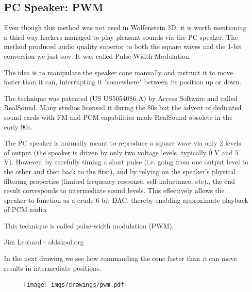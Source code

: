 \subsection{PC Speaker: PWM}
Even though this method was not used in Wolfenstein 3D, it is worth mentioning a third way hackers managed to play pleasant sounds via the PC speaker. The method produced audio quality superior to both the square waves and the 1-bit conversion we just saw. It was called Pulse Width Modulation.\\
\par
The idea is to manipulate the speaker cone manually and instruct it to move faster than it can, interrupting it "somewhere" between its position up or down.\\
\par
The technique was patented (US US5054086 A) by Access Software and called RealSound. Many studios licensed it during the 80s but the advent of dedicated sound cards with FM and PCM capabilities made RealSound obsolete in the early 90s.
\par
 \begin{fancyquotes}
  The PC speaker is normally meant to reproduce a square wave via only 2 levels of output (the speaker is driven by only two voltage levels, typically 0 V and 5 V). However, by carefully timing a short pulse (i.e. going from one output level to the other and then back to the first), and by relying on the speaker's physical filtering properties (limited frequency response, self-inductance, etc)., the end result corresponds to intermediate sound levels. This effectively allows the speaker to function as a crude 6 bit DAC, thereby enabling approximate playback of PCM audio.\\
  \par
  This technique is called pulse-width modulation (PWM).\\
  \par
  Jim Leonard - oldskool.org
 \end{fancyquotes}
\par
In the next drawing we see how commanding the cone faster than it can move results in intermediate positions.
\par
\begin{figure}[H]
  \centering
  \texttt{[image: imgs/drawings/pwm.pdf]}
  
\end{figure}
\par





